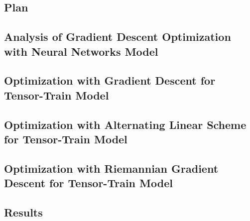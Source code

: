 \documentclass[11pt]{article}
\begin{document}
    \subsection{Plan}\label{subsec:plan}
    

    \subsection{Analysis of Gradient Descent Optimization with Neural Networks Model}
    \label{subsec:analysis-of-gradient-descent-optimization-with-neural-networks-model}

    \subsection{Optimization with Gradient Descent for Tensor-Train Model}\label{subsec:optimization-with-gradient-descent}
    

    \subsection{Optimization with Alternating Linear Scheme for Tensor-Train Model}\label{subsec:optimization-with-alternating-linear-scheme}
    

    \subsection{Optimization with Riemannian Gradient Descent for Tensor-Train Model}\label{subsec:optimization-with-riemannian-gradient-descent}
    

    \subsection{Results}\label{subsec:results}
    

\end{document}

